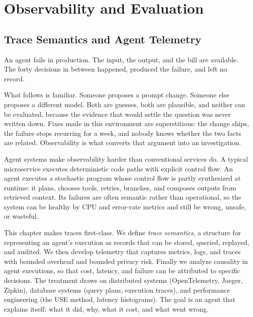 \documentclass[11pt]{book}
\begin{document}
\part{Observability and Evaluation}


\chapter{Trace Semantics and Agent Telemetry}
\label{ch:traces}

An agent fails in production. The input, the output, and the bill are available. The forty decisions in between happened, produced the failure, and left no record.

What follows is familiar. Someone proposes a prompt change. Someone else proposes a different model. Both are guesses, both are plausible, and neither can be evaluated, because the evidence that would settle the question was never written down. Fixes made in this environment are superstitious: the change ships, the failure stops recurring for a week, and nobody knows whether the two facts are related. Observability is what converts that argument into an investigation.

Agent systems make observability harder than conventional services do. A typical microservice executes deterministic code paths with explicit control flow. An agent executes a stochastic program whose control flow is partly synthesized at runtime: it plans, chooses tools, retries, branches, and composes outputs from retrieved context. Its failures are often semantic rather than operational, so the system can be healthy by CPU and error-rate metrics and still be wrong, unsafe, or wasteful.

This chapter makes traces first-class. We define \emph{trace semantics}, a structure for representing an agent's execution as records that can be stored, queried, replayed, and audited. We then develop telemetry that captures metrics, logs, and traces with bounded overhead and bounded privacy risk. Finally we analyze causality in agent executions, so that cost, latency, and failure can be attributed to specific decisions. The treatment draws on distributed systems (OpenTelemetry, Jaeger, Zipkin), database systems (query plans, execution traces), and performance engineering (the USE method, latency histograms). The goal is an agent that explains itself: what it did, why, what it cost, and what went wrong.
\end{document}
